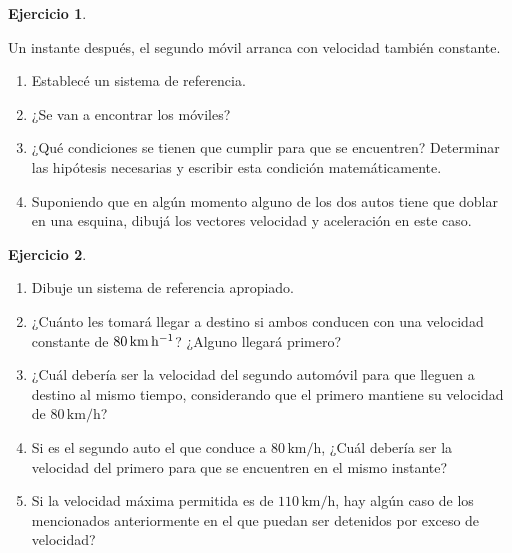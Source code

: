 \documentclass[a4paper,12pt,twoside]{book}
\newtheorem{ejercicio}{{Ejercicio}}[chapter]
\begin{document}
\begin{mdframed}[style=ejercicio-intermedio]
    \begin{ejercicio}
    \end{ejercicio}
    Un instante después, el segundo móvil arranca con velocidad también constante.
    \begin{enumerate}
        \item Establecé un sistema de referencia.
        \item ¿Se van a encontrar los móviles?
        \item ¿Qué condiciones se tienen que cumplir para que se encuentren? Determinar las hipótesis necesarias y escribir esta condición matemáticamente.
        \item Suponiendo que en algún momento alguno de los dos autos tiene que doblar en una esquina, dibujá los vectores velocidad y aceleración en este caso.
    \end{enumerate}
\end{mdframed}

\begin{mdframed}[style=ejercicio-intermedio]
    \begin{ejercicio}
    \end{ejercicio}
    \begin{enumerate}
        \item Dibuje un sistema de referencia apropiado.
        \item ¿Cuánto les tomará llegar a destino si ambos conducen con una velocidad constante de $80\,  \si{\kilo\metre\per\hour}$? ¿Alguno llegará primero?
        \item ¿Cuál debería ser la velocidad del segundo automóvil para que lleguen a destino al mismo tiempo, considerando que el primero mantiene su velocidad de $80\,\si{\kilo\metre\per\hour}$?
        \item Si es el segundo auto el que conduce a $80\,  \si{\kilo\metre\per\hour}$, ¿Cuál debería ser la velocidad del primero para que se encuentren en el mismo instante?
        \item Si la velocidad máxima permitida es de $110\,  \si{\kilo\metre\per\hour}$, hay algún caso de los mencionados anteriormente en el que puedan ser detenidos por exceso de velocidad?
    \end{enumerate}
\end{mdframed}
\end{document}
